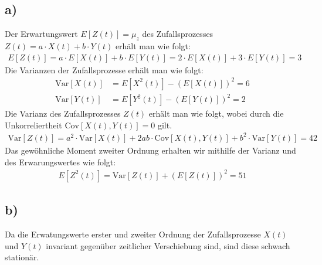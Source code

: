 \documentclass[11pt]{scrartcl} %
\begin{document}
\subsection*{a)}
Der Erwartungswert $E[Z(t)]=\mu_z$ des Zufallsprozesses $Z(t)=a\cdot X(t)+b\cdot Y(t)$ erhält man wie folgt:
\begin{align*}
	E[Z(t)]=a\cdot E[X(t)]+b\cdot E[Y(t)]=2\cdot E[X(t)]+3\cdot E[Y(t)]=3
\end{align*}
Die Varianzen der Zufallsprozesse erhält man wie folgt:
\begin{align*}
	\text{Var}[X(t)]&=E[X^2(t)]-(E[X(t)])^2=6\\
	\text{Var}[Y(t)]&=E[Y^2(t)]-(E[Y(t)])^2=2
\end{align*}
Die Varianz des Zufallsprozesses $Z(t)$ erhält man wie folgt, wobei durch die Unkorreliertheit $\text{Cov}[X(t),Y(t)]=0$ gilt.
\begin{align*}
\text{Var}[Z(t)]=a^2\cdot\text{Var}[X(t)]+2ab\cdot\text{Cov}[X(t),Y(t)]+b^2\cdot\text{Var}[Y(t)]=42
\end{align*}
Das gewöhnliche Moment zweiter Ordnung erhalten wir mithilfe der Varianz und des Erwarungswertes wie folgt:
\begin{align*}
		E[Z^2(t)]=\text{Var}[Z(t)]+(E[Z(t)])^2=51
\end{align*}
\subsection*{b)}
Da die Erwatungswerte erster und zweiter Ordnung der Zufallsprozesse $X(t)$ und $Y(t)$ invariant gegenüber zeitlicher Verschiebung sind, sind diese schwach stationär.
\end{document}
